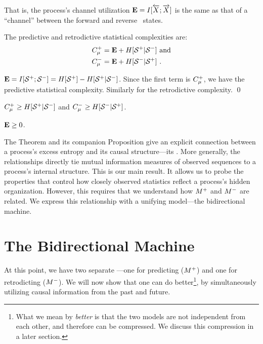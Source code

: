 That is, the process's channel utilization \mbox{${\bf E} = I[\smash{\overleftarrow {{X}}};\smash{\overrightarrow{{X}}}]$}
is the same as that of a ``channel'' between the forward and reverse
\eM\ states.

\begin{Prop}
The predictive and retrodictive statistical complexities are:
\begin{align}
\label{FutureCmuReln}
C_\mu^{+} &= {\bf E} + H[{\mathcal{S}}^{+}|{\mathcal{S}}^{-}]
  \mathrm{~and} \\
\label{PastCmuReln}
C_\mu^{-} &= {\bf E} + H[{\mathcal{S}}^{-}|{\mathcal{S}}^{+}] ~.
\end{align}
\end{Prop}
    
\begin{ProProp}
${\bf E} = I[{\mathcal{S}}^{+};{\mathcal{S}}^{-}] =
H[{\mathcal{S}}^{+}] - H[{\mathcal{S}}^{+}|{\mathcal{S}}^{-}]$.
Since the first term is $C_\mu^{+}$, we have the predictive
statistical complexity. Similarly for the retrodictive complexity.
\qed
\end{ProProp}
    
\begin{Cor}
$C_\mu^{+} \geq H[{\mathcal{S}}^{+}|{\mathcal{S}}^{-}]$ and 
$C_\mu^{-} \geq H[{\mathcal{S}}^{-}|{\mathcal{S}}^{+}]$.
\end{Cor}
    
\begin{ProCor}
${\bf E} \geq 0$.
\end{ProCor}
    
The Theorem and its companion Proposition give an explicit connection between
a process's excess entropy and its causal structure---its \eMs. More generally,
the relationships directly tie mutual information measures of observed
sequences to a process's internal structure. This is our main result. It allows
us to probe the properties that control how closely observed statistics reflect
a process's hidden organization. However, this requires that we understand how 
${M}^{+}$ and ${M}^{-}$ are related. We express this relationship with a unifying
model---the bidirectional machine.

\section{The Bidirectional Machine}

At this point, we have two separate \eMs---one for predicting (${M}^{+}$) and
one for retrodicting (${M}^{-}$). We will now show that one can do better\footnote{What we mean by \emph{better} is that the two models are not independent from each other, and therefore can be compressed. We discuss this compression in a later section.}, by simultaneously utilizing causal information from the past and future.

